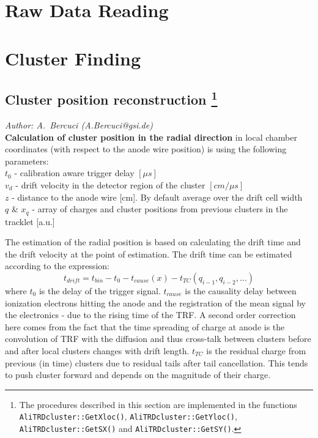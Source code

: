 \documentclass{alicetdr}
\begin{document}
\section{Raw Data Reading}
%
\section{Cluster Finding}\label{REC:CL:}
%
\subsection[Cluster position reconstruction]{Cluster position reconstruction
\footnote{The procedures described in this section are implemented in the functions
{\tt AliTRDcluster::GetXloc()}, {\tt AliTRDcluster::GetYloc()},
{\tt AliTRDcluster::GetSX()} and {\tt AliTRDcluster::GetSY()}.}}\label{REC:CL:rphi}
{\it Author: A.~Bercuci (A.Bercuci@gsi.de)}
\\
{\bf Calculation of cluster position in the radial direction} in local chamber
coordinates (with respect to the anode wire position) is using the following
parameters:\\
  $t_0$ - calibration aware trigger delay $[\mu s]$\\
  $v_d$ - drift velocity in the detector region of the cluster $[cm/\mu s]$\\
  $z$ - distance to the anode wire [cm]. By default average over the drift cell width\\
  $q$ \& $x_q$ - array of charges and cluster positions from previous clusters in the tracklet [a.u.]

The estimation of the radial position is based on calculating the drift time
and the drift velocity at the point of estimation. The drift time can be
estimated according to the expression:
\begin{equation}
t_{drift} = t_{bin} - t_{0} - t_{cause}(x) - t_{TC}(q_{i-1}, q_{i-2}, ...)
\end{equation}
where $t_0$ is the delay of the trigger signal. $t_{cause}$ is the causality
delay between ionization electrons hitting the anode and the registration of
the mean signal by the electronics - due to the rising time of the TRF. A
second order correction here comes from the fact that the time spreading of
charge at anode is the convolution of TRF with the diffusion and thus
cross-talk between clusters before and after local clusters changes with drift
length. $t_{TC}$ is the residual charge from previous (in time) clusters due
to residual tails after tail cancellation. This tends to push cluster forward
and depends on the magnitude of their charge.
\end{document}
